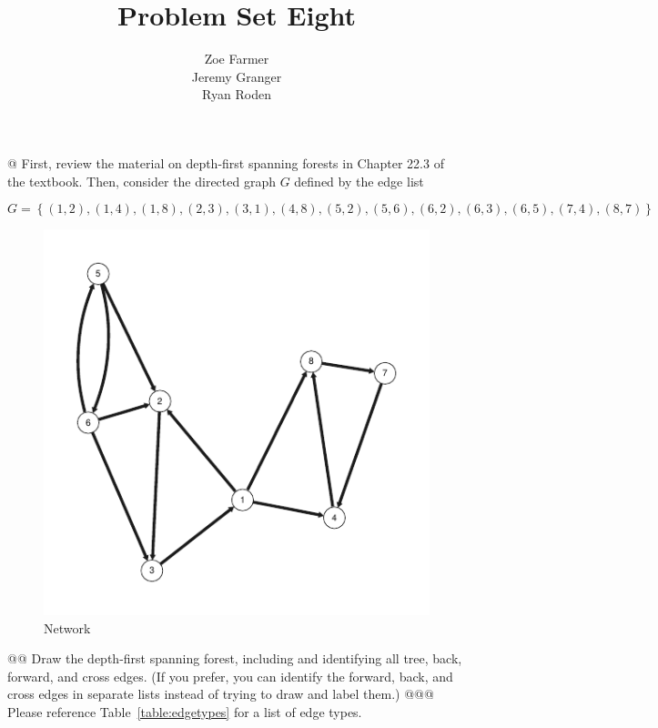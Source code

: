 \documentclass[10pt]{article}\usepackage[]{graphicx}\usepackage[]{xcolor}
\title{Problem Set Eight}
\author{Zoe Farmer\\Jeremy Granger\\Ryan Roden}
\makeatletter
\def\maxwidth{ %
  \ifdim\Gin@nat@width>\linewidth
    \linewidth
  \else
    \Gin@nat@width
  \fi
}
\newenvironment{knitrout}{}{} %
\makeatother
\begin{document}
\maketitle




\begin{easylist}[enumerate]
    @ First, review the material on depth-first spanning forests in Chapter 22.3 of the textbook. Then, consider the
    directed graph $G$ defined by the edge list

    \[
        G =
        \left\{
            (1, 2),
            (1, 4),
            (1, 8),
            (2, 3),
            (3, 1),
            (4, 8),
            (5, 2),
            (5, 6),
            (6, 2),
            (6, 3),
            (6, 5),
            (7, 4),
            (8, 7)
        \right\}
    \]

\begin{knitrout}
\color{fgcolor}\begin{figure}[H]


{\centering \includegraphics[width=\maxwidth]{figure/ps8_1network} 

}

\caption[Network]{Network\label{fig:ps8.1network}}
\end{figure}


\end{knitrout}


    @@ Draw the depth-first spanning forest, including and identifying all tree, back, forward, and cross edges. (If you
    prefer, you can identify the forward, back, and cross edges in separate lists instead of trying to draw and label
    them.)
    @@@ Please reference Table~\ref{table:edgetypes} for a list of edge types.


\end{easylist}
\end{document}
